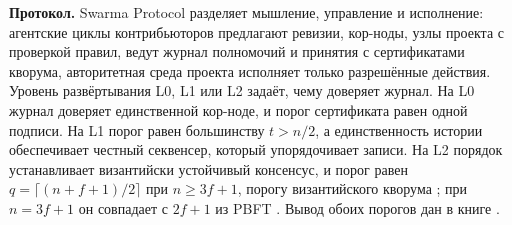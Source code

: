 \documentclass[10pt,a4paper]{article}
\begin{document}
\textbf{Протокол.} Swarma Protocol разделяет мышление, управление и исполнение: агентские циклы контрибьюторов предлагают ревизии, кор-ноды, узлы проекта с проверкой правил, ведут журнал полномочий и принятия с сертификатами кворума, авторитетная среда проекта исполняет только разрешённые действия. Уровень развёртывания L0, L1 или L2 задаёт, чему доверяет журнал. На L0 журнал доверяет единственной кор-ноде, и порог сертификата равен одной подписи. На L1 порог равен большинству $t>n/2$, а единственность истории обеспечивает честный секвенсер, который упорядочивает записи. На L2 порядок устанавливает византийски устойчивый консенсус, и порог равен $q=\lceil (n+f+1)/2\rceil$ при $n\ge3f+1$, порогу византийского кворума \cite{byzquorum}; при $n=3f+1$ он совпадает с $2f+1$ из PBFT \cite{pbft}. Вывод обоих порогов дан в книге \cite{swarmabook}.
\end{document}
